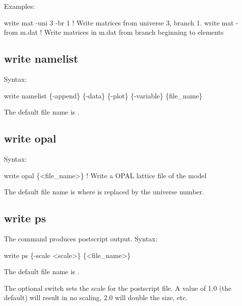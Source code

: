 {{{{{{{{{{{Examples:
\begin{example}
  write mat -uni 3 -br 1  ! Write matrices from universe 3, branch 1.
  write mat -from m.dat   ! Write matrices in m.dat from branch beginning to elements
\end{example}


\subsection{write namelist}
\label{s:write.namelist}

Syntax:
\begin{example}
    write namelist \{-append\} \{-data\} \{-plot\} \{-variable\} \{file_name\}
\end{example}

The default file name is .


\subsection{write opal}
\label{s:write.opal}

Syntax:
\begin{example}
    write opal \{<file_name>\}  ! Write a OPAL lattice file of the model
\end{example}

The default file name is  where \vn{\#} is replaced by the universe number. 


\subsection{write ps}
\label{s:write.ps}

The  command produces postscript output. Syntax:
\begin{example}
  write ps \{-scale <scale>\} \{<file_name>\}
\end{example}

The default file name is . 

The optional  switch sets the scale for the postscript file. A value of 1.0 (the
default) will result in no scaling, 2.0 will double the size, etc.

}}}}}}}}}}}
